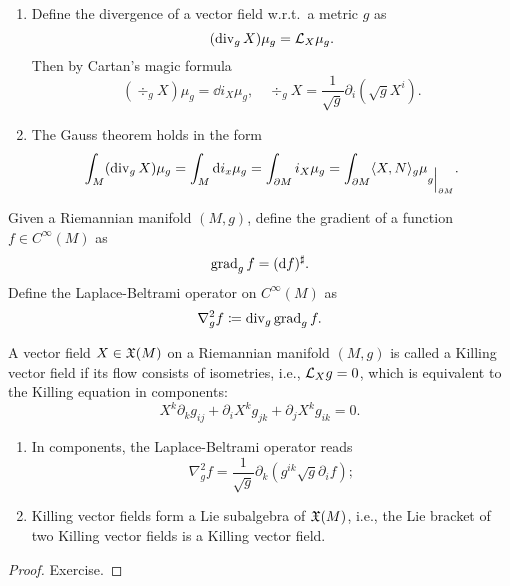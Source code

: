 \begin{cor}
    \begin{enumerate}
        \item Define the divergence of a vector field w.r.t.\ a metric $g$ as 
        \[(\operatorname{div}_g X)\mu_g=\mathcal{L}_X \mu_g.\]
        Then by Cartan's magic formula
        \[(\div_g X)\mu_g=\dd i_X \mu_g,\quad \div_g X=\frac{1}{\sqrt g}\partial_i(\sqrt g X^i).\label{divergence in components}\]
        \item The Gauss theorem holds in the form 
        \[\int_M (\div_g X)\mu_g=\int_M \dd i_x \mu_g=\int_{\partial M}i_X \mu_g=\int_{\partial M}\langle X,N\rangle_g \mu_{\restr{g}{\partial M}}.\]
    \end{enumerate}
\end{cor}

\begin{defn}
    Given a Riemannian manifold $(M,g)$, define the gradient  of a function $f\in C^\infty(M)$ as 
    \[\operatorname{grad}_g f=(\mathop{}\!\mathrm{d} f)^\sharp.\]
    Define the Laplace-Beltrami operator  on $C^\infty(M)$ as
    \[\nabla^2_g f \coloneqq \operatorname{div}_g \operatorname{grad}_g f.\]
\end{defn}
\begin{defn}
    A vector field $X\in\mathfrak{X}(M)$ on a Riemannian manifold $(M,g)$ is called a Killing vector field if its flow consists of isometries, i.e., $\mathcal{L}_X g=0$, which is equivalent to the Killing equation in components:
    \[X^k\partial_k g_{ij}+\partial_i X^k g_{jk}+\partial_j X^k g_{ik}=0.\]
\end{defn}

\begin{cor}
    \begin{enumerate}
        \item In components, the Laplace-Beltrami operator reads 
        \[\nabla^2_g f=\frac{1}{\sqrt g}\partial_k (g^{ik}\sqrt g \partial_i f);\label{laplacian in components}\]
        \item Killing vector fields form a Lie subalgebra of $\mathfrak{X}(M)$, i.e., the Lie bracket of two Killing vector fields is a Killing vector field.
    \end{enumerate}
\end{cor}
\begin{proof}
    Exercise.
\end{proof}

